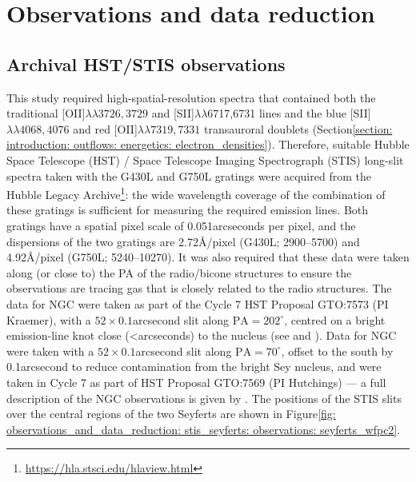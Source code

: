 \section{Observations and data reduction}
\label{section: stis_seyferts: observations_and_data_reduction}

\subsection{Archival HST/STIS observations}
\label{section: stis_seyferts: observations_and_data_reduction observations}

This study required high-spatial-resolution spectra that contained both the traditional [OII]$\lambda\lambda3726,3729$ and [SII]$\lambda\lambda$6717,6731 lines and the blue [SII]$\lambda\lambda4068,4076$ and red [OII]$\lambda\lambda7319,7331$ transauroral doublets (Section\;\ref{section: introduction: outflows: energetics: electron_densities}). Therefore, suitable Hubble Space Telescope (HST) / Space Telescope Imaging Spectrograph (STIS) long-slit spectra taken with the G430L and G750L gratings were acquired from the Hubble Legacy Archive\footnote{\url{https://hla.stsci.edu/hlaview.html}}: the wide wavelength coverage of the combination of these gratings is sufficient for measuring the required emission lines. Both gratings have a spatial pixel scale of 0.051\;arcseconds per pixel, and the dispersions of the two gratings are 2.72\;\AA/pixel (G430L; 2900--5700\;{\AA}) and 4.92\;\AA/pixel (G750L; 5240--10270\;{\AA}). It was also required that these data were taken along (or close to) the PA of the radio/bicone structures to ensure the observations are tracing gas that is closely related to the radio structures. The data for NGC were taken as part of the Cycle 7 HST Proposal GTO:7573 (PI Kraemer), with a $52\times0.1$\;arcsecond slit along $\mathrm{PA}=202^\circ$, centred on a bright emission-line knot close (\textless{}\;arcseconds) to the nucleus (see \citealt{Crenshaw2000b} and \citealt{Kraemer2000II}). Data for NGC were taken with a $52\times0.1$\;arcsecond slit along $\mathrm{PA}=70^\circ$, offset to the south by 0.1\;arcsecond to reduce contamination from the bright Sey nucleus, and were taken in Cycle 7 as part of HST Proposal GTO:7569 (PI Hutchings) --- a full description of the NGC observations is given by \citet{Nelson2000}. The positions of the STIS slits over the central regions of the two Seyferts are shown in Figure\;\ref{fig: observations_and_data_reduction: stis_seyferts: observations: seyferts_wfpc2}.

